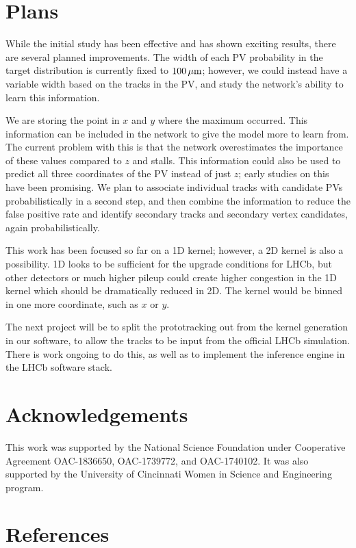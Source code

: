 \documentclass[a4paper]{jpconf}
\begin{document}
\section{Plans}

While the initial study has been effective and has shown exciting results, there are several planned improvements. The width of each PV probability in the target distribution is currently fixed to $\unit[100]{\mu m}$; however, we could instead have a variable width based on the tracks in the PV, and study the network's ability to learn this information.

We are storing the point in $x$ and $y$ where the maximum occurred. This information can be included in the network to give the model more to learn from. The current problem with this is that the network overestimates the importance of these values compared to $z$ and stalls. This information could also be used to predict all three coordinates of the PV instead of just $z$; early studies on this have been promising. We plan to associate individual tracks with candidate PVs probabilistically in a second step, and then combine the information to reduce the false positive rate and identify secondary tracks and secondary vertex candidates, again probabilistically.

This work has been focused so far on a 1D kernel; however, a 2D kernel is also a possibility. 1D looks to be sufficient for the upgrade conditions for LHCb, but other detectors or much higher pileup could create higher congestion in the 1D kernel which should be dramatically reduced in 2D. The kernel would be binned in one more coordinate, such as $x$ or $y$.

The next project will be to split the prototracking out from the kernel generation in our software, to allow the tracks to be input from the official LHCb simulation. There is work ongoing to do this, as well as to implement the inference engine in the LHCb software stack.


\section*{Acknowledgements}

This work was supported by the National Science Foundation under Cooperative Agreement OAC-1836650, OAC-1739772, and OAC-1740102. It was also supported by the University of Cincinnati Women in Science and Engineering program.

\section*{References}


\end{document}
